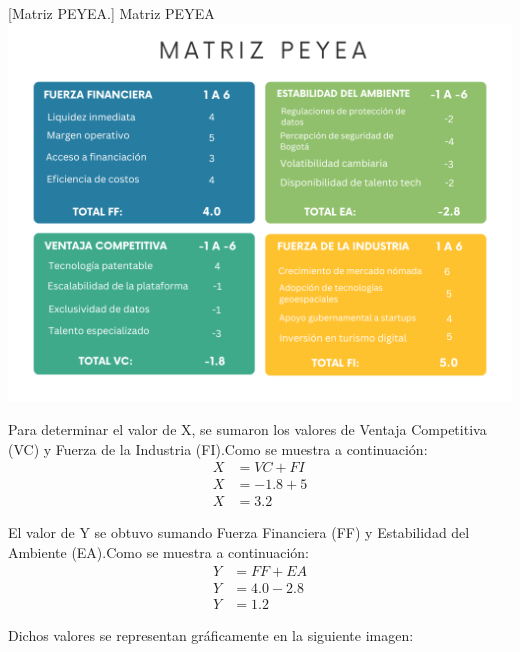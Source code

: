\vspace{2mm}
\begin{minipage}{0.9\textwidth}
\centering
{}[{Matriz PEYEA.}]{ Matriz PEYEA }
\label{peyea}
\includegraphics[scale=0.5]{Content/Images/Matriz PEYEA.png}
\end{minipage}

Para determinar el valor de X, se sumaron los valores de Ventaja Competitiva (VC) y Fuerza de la Industria (FI).Como se muestra a continuación:
\begin{align*}
X &= VC + FI \\
X &= -1.8+5 \\
X &= 3.2
\end{align*}

El valor de Y se obtuvo sumando Fuerza Financiera (FF) y Estabilidad del Ambiente (EA).Como se muestra a continuación:
\begin{align*}
Y &= FF + EA \\
Y &= 4.0-2.8 \\
Y &= 1.2
\end{align*}

Dichos valores se representan gráficamente en la siguiente imagen:

